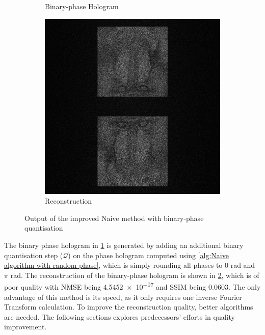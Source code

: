 \begin{figure}[H]
\begin{subfigure}[t]{0.3\textwidth}
    \caption{Binary-phase Hologram}
    \label{fig:Naive_binary_Holo}
  \end{subfigure}
  \hfill
  \begin{subfigure}[t]{0.3\textwidth}
    \centering
    \includegraphics[width=\textwidth]{Naive_binary_Recon.png}
    \caption{Reconstruction}
    \label{fig:Naive_binary_Recon}
  \end{subfigure}
  \caption{Output of the improved Naive method with binary-phase quantisation}
  \label{fig:Output of the improved Naive method with binary-phase quantisation}
\end{figure}

The binary phase hologram in \cref{fig:Naive_binary_Holo} is generated by adding an additional binary quantisation step ($\mathcal{Q}$) on the phase hologram computed using \cref{alg:Naive algorithm with random phase}, which is simply rounding all phases to 0 rad and $\pi$ rad. The reconstruction of the binary-phase hologram is shown in \cref{fig:Naive_binary_Recon}, which is of poor quality with NMSE being \num{4.5452e-07} and SSIM being 0.0603. The only advantage of this method is its speed, as it only requires one inverse Fourier Transform calculation. To improve the reconstruction quality, better algorithms are needed. The following sections explores predecessors' efforts in quality improvement.


